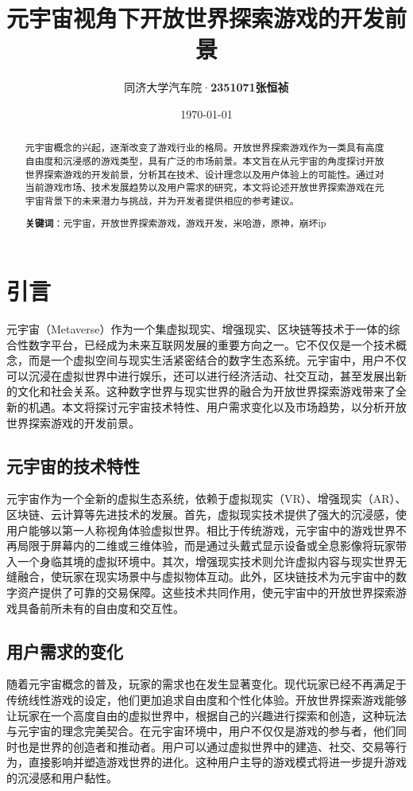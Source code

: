\documentclass[UTF8]{ctexart}
\title{\textbf{元宇宙视角下开放世界探索游戏的开发前景}}
\author{同济大学汽车院·\textbf{2351071张恒祯}}
\date{\today}
\begin{document}
	\maketitle
	\renewcommand{\abstractname}{\Large 摘要\\}
	\begin{abstract}
		\normalsize
		元宇宙概念的兴起，逐渐改变了游戏行业的格局。开放世界探索游戏作为一类具有高度自由度和沉浸感的游戏类型，具有广泛的市场前景。本文旨在从元宇宙的角度探讨开放世界探索游戏的开发前景，分析其在技术、设计理念以及用户体验上的可能性。通过对当前游戏市场、技术发展趋势以及用户需求的研究，本文将论述开放世界探索游戏在元宇宙背景下的未来潜力与挑战，并为开发者提供相应的参考建议。	
			
		\textbf{关键词}：元宇宙，开放世界探索游戏，游戏开发，米哈游，原神，崩坏ip
	\end{abstract}
	
	
	\section{引言}
	
	元宇宙（Metaverse）作为一个集虚拟现实、增强现实、区块链等技术于一体的综合性数字平台，已经成为未来互联网发展的重要方向之一\cite{xu2021metaverse}。它不仅仅是一个技术概念，而是一个虚拟空间与现实生活紧密结合的数字生态系统。元宇宙中，用户不仅可以沉浸在虚拟世界中进行娱乐，还可以进行经济活动、社交互动，甚至发展出新的文化和社会关系。这种数字世界与现实世界的融合为开放世界探索游戏带来了全新的机遇。本文将探讨元宇宙技术特性、用户需求变化以及市场趋势，以分析开放世界探索游戏的开发前景。
	
	\subsection{元宇宙的技术特性}
	元宇宙作为一个全新的虚拟生态系统，依赖于虚拟现实（VR）、增强现实（AR）、区块链、云计算等先进技术的发展。首先，虚拟现实技术提供了强大的沉浸感，使用户能够以第一人称视角体验虚拟世界。相比于传统游戏，元宇宙中的游戏世界不再局限于屏幕内的二维或三维体验，而是通过头戴式显示设备或全息影像将玩家带入一个身临其境的虚拟环境中。其次，增强现实技术则允许虚拟内容与现实世界无缝融合，使玩家在现实场景中与虚拟物体互动。此外，区块链技术为元宇宙中的数字资产提供了可靠的交易保障\cite{grigore2021vrgames}。这些技术共同作用，使元宇宙中的开放世界探索游戏具备前所未有的自由度和交互性。
	
	\subsection{用户需求的变化}
	随着元宇宙概念的普及，玩家的需求也在发生显著变化。现代玩家已经不再满足于传统线性游戏的设定，他们更加追求自由度和个性化体验。开放世界探索游戏能够让玩家在一个高度自由的虚拟世界中，根据自己的兴趣进行探索和创造，这种玩法与元宇宙的理念完美契合\cite{silva2022gamerneeds}。在元宇宙环境中，用户不仅仅是游戏的参与者，他们同时也是世界的创造者和推动者。用户可以通过虚拟世界中的建造、社交、交易等行为，直接影响并塑造游戏世界的进化。这种用户主导的游戏模式将进一步提升游戏的沉浸感和用户黏性。
	
\end{document}
